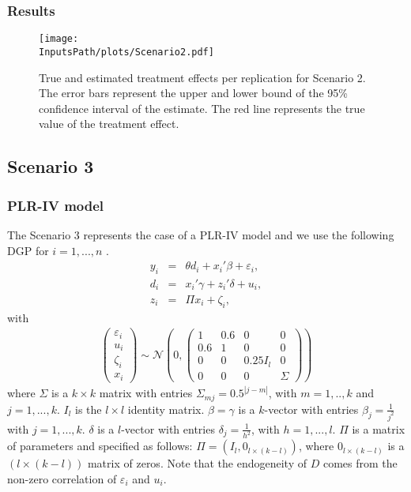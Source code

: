 \documentclass[10pt]{article}
\newcommand*{\InputsFolderPath}{C:/DEV/DML/src/data/}
\newcommand*{\InputsPath}{\InputsFolderPath/20221107}
\begin{document}
\subsubsection{Results}
\begin{figure}[H]
	\begin{center}
		\texttt{[image: \\InputsPath/plots/Scenario2.pdf]}
		\caption{True and estimated treatment effects per replication for Scenario 2. The error bars represent the upper and lower bound of the 95\% confidence interval of the estimate. The red line represents the true value of the treatment effect.}
		\label{Scenario2}
	\end{center}
\end{figure}



\subsection{Scenario 3}
\subsubsection{PLR-IV model}
The Scenario 3 represents the case of a PLR-IV model and we use the following DGP for $i=1,...,n$ \cite{Cher2015}.
\begin{eqnarray*}\label{dgp_2.1}
y_i &=& \theta d_i + x_i' \beta + \varepsilon_i,	\\
d_i &=& x_i' \gamma + z_i' \delta + u_i, \\
z_i &=& \Pi x_i + \zeta_i, 
\end{eqnarray*}
with
\begin{eqnarray*}\label{dgp_2.2}
	\left(\begin{matrix} \varepsilon_i \\ u_i \\ \zeta_i \\ x_i \end{matrix} \right) \sim
\mathcal{N}\left(0, \left(\begin{matrix} 1 & 0.6 & 0 & 0 \\ 0.6 & 1 & 0 & 0 \\
	0 & 0 & 0.25 I_{l} & 0 \\ 0 & 0 & 0 & \Sigma \end{matrix} \right) \right)
\end{eqnarray*}
where  $\Sigma$ is a $k \times k$ matrix with entries
$\Sigma_{mj} = 0.5^{|j-m|}$, with $m=1,..,k$ and $j=1,...,k$. 
$I_{l}$ is the $l \times l$ identity matrix.
$\beta = \gamma$ is a $k$-vector with entries $\beta_j=\frac{1}{j^2}$ with  $j=1,...,k$.
$\delta$ is a $l$-vector with entries $\delta_j=\frac{1}{h^2}$, with $h=1,...,l$.
$\Pi$ is a matrix of parameters and specified as follows: $\Pi = (I_{l}, 0_{l \times (k - l)})$, where $ 0_{l \times (k - l)}$ is a $(l \times (k-l))$ matrix of zeros.
Note that the endogeneity of $D$ comes from the non-zero correlation of $\varepsilon_i$ and $u_i$.
\end{document}
